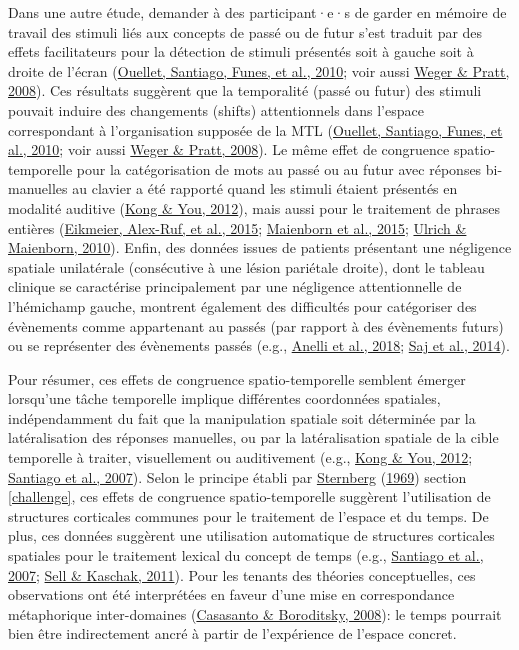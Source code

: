 \documentclass[
  a4paper,12pt,twoside,onecolumn,openright,final,oldfontcommands]{memoir}
\begin{document}
Dans une autre étude, demander à des participant·e·s de garder en mémoire de travail des stimuli liés aux concepts de passé ou de futur s'est traduit par des effets facilitateurs pour la détection de stimuli présentés soit à gauche soit à droite de l'écran (\protect\hyperlink{ref-ouellet_thinking_2010}{Ouellet, Santiago, Funes, et al., 2010}; voir aussi \protect\hyperlink{ref-weger_time_2008}{Weger \& Pratt, 2008}). Ces résultats suggèrent que la temporalité (passé ou futur) des stimuli pouvait induire des changements (shifts) attentionnels dans l'espace correspondant à l'organisation supposée de la MTL (\protect\hyperlink{ref-ouellet_thinking_2010}{Ouellet, Santiago, Funes, et al., 2010}; voir aussi \protect\hyperlink{ref-weger_time_2008}{Weger \& Pratt, 2008}). Le même effet de congruence spatio-temporelle pour la catégorisation de mots au passé ou au futur avec réponses bi-manuelles au clavier a été rapporté quand les stimuli étaient présentés en modalité auditive (\protect\hyperlink{ref-kong_space-time_2012}{Kong \& You, 2012}), mais aussi pour le traitement de phrases entières (\protect\hyperlink{ref-eikmeier_how_2015}{Eikmeier, Alex-Ruf, et al., 2015}; \protect\hyperlink{ref-maienborn_we_2015}{Maienborn et al., 2015}; \protect\hyperlink{ref-ulrich_leftright_2010}{Ulrich \& Maienborn, 2010}). Enfin, des données issues de patients présentant une négligence spatiale unilatérale (consécutive à une lésion pariétale droite), dont le tableau clinique se caractérise principalement par une négligence attentionnelle de l'hémichamp gauche, montrent également des difficultés pour catégoriser des évènements comme appartenant au passés (par rapport à des évènements futurs) ou se représenter des évènements passés (e.g., \protect\hyperlink{ref-anelli_effects_2018}{Anelli et al., 2018}; \protect\hyperlink{ref-saj_patients_2014}{Saj et al., 2014}).

Pour résumer, ces effets de congruence spatio-temporelle semblent émerger lorsqu'une tâche temporelle implique différentes coordonnées spatiales, indépendamment du fait que la manipulation spatiale soit déterminée par la latéralisation des réponses manuelles, ou par la latéralisation spatiale de la cible temporelle à traiter, visuellement ou auditivement (e.g., \protect\hyperlink{ref-kong_space-time_2012}{Kong \& You, 2012}; \protect\hyperlink{ref-santiago_time_2007}{Santiago et al., 2007}). Selon le principe établi par \protect\hyperlink{ref-sternberg_discovery_1969}{Sternberg} (\protect\hyperlink{ref-sternberg_discovery_1969}{1969}) section \ref{challenge}, ces effets de congruence spatio-temporelle suggèrent l'utilisation de structures corticales communes pour le traitement de l'espace et du temps. De plus, ces données suggèrent une utilisation automatique de structures corticales spatiales pour le traitement lexical du concept de temps (e.g., \protect\hyperlink{ref-santiago_time_2007}{Santiago et al., 2007}; \protect\hyperlink{ref-sell_processing_2011}{Sell \& Kaschak, 2011}). Pour les tenants des théories conceptuelles, ces observations ont été interprétées en faveur d'une mise en correspondance métaphorique inter-domaines (\protect\hyperlink{ref-casasanto_time_2008}{Casasanto \& Boroditsky, 2008}): le temps pourrait bien être indirectement ancré à partir de l'expérience de l'espace concret.
\end{document}
